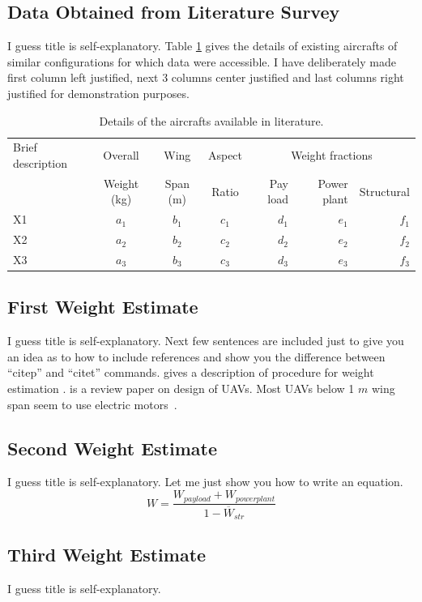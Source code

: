 \subsection{Data Obtained from Literature Survey}
I guess title is self-explanatory.
Table \ref{tab:lit_survey} gives the details of existing aircrafts of similar configurations for which data were accessible.
I have deliberately made first column left justified, next 3 columns center justified and last columns right justified for demonstration purposes.
%
\begin{table}
\begin{center}
\caption{Details of the aircrafts available in literature.}
   \begin{tabular}{|l|c|c|c|r|r|r|}
   \hline
Brief description & Overall & Wing & Aspect &\multicolumn{3}{c|}{Weight fractions}  \\ \cline{5-7}
 & Weight (kg) & Span (m) & Ratio & Pay load & Power plant & Structural \\ \hline
 X1 & $a_1$ & $b_1$ & $c_1$ & $d_1$ & $e_1$ & $f_1$  \\ \hline
 X2 & $a_2$ & $b_2$ & $c_2$ & $d_2$ & $e_2$ & $f_2$  \\ \hline
 X3 & $a_3$ & $b_3$ & $c_3$ & $d_3$ & $e_3$ & $f_3$  \\ \hline
   \end{tabular}
\label{tab:lit_survey}
\end{center}
\end{table}
%
\subsection{First Weight Estimate}
I guess title is self-explanatory.
Next few sentences are included just to give you an idea as to how to include references and show you the difference between ``citep'' and ``citet'' commands.
\citet{Raymer_book} gives a description of procedure for weight estimation .
\citet{Joel_paper} is a review paper on design of UAVs.
Most UAVs below 1 $m$ wing span seem to use electric motors~\citep{random_book}.
%
\subsection{Second Weight Estimate}
I guess title is self-explanatory.
Let me just show you how to write an equation.
\begin{equation}
W = \frac{W_{payload}+W_{power plant}}{1-\overline{W}_{str}}
\end{equation}
%
\subsection{Third Weight Estimate}
I guess title is self-explanatory.
%
